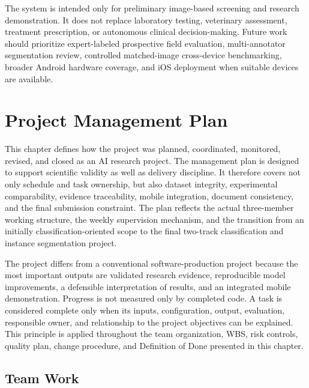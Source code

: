 \documentclass[12pt,a4paper]{report}
\newenvironment{revisionblock}{\begin{snugshade}\noindent}{\end{snugshade}}
\begin{document}
\begin{revisionblock}
The system is intended only for preliminary image-based screening and research demonstration. It does not replace laboratory testing, veterinary assessment, treatment prescription, or autonomous clinical decision-making. Future work should prioritize expert-labeled prospective field evaluation, multi-annotator segmentation review, controlled matched-image cross-device benchmarking, broader Android hardware coverage, and iOS deployment when suitable devices are available.
\end{revisionblock}
\chapter{Project Management Plan}
This chapter defines how the project was planned, coordinated, monitored, revised, and closed as an AI research project. The management plan is designed to support scientific validity as well as delivery discipline. It therefore covers not only schedule and task ownership, but also dataset integrity, experimental comparability, evidence traceability, mobile integration, document consistency, and the final submission constraint. The plan reflects the actual three-member working structure, the weekly supervision mechanism, and the transition from an initially classification-oriented scope to the final two-track classification and instance segmentation project.\par
The project differs from a conventional software-production project because the most important outputs are validated research evidence, reproducible model improvements, a defensible interpretation of results, and an integrated mobile demonstration. Progress is not measured only by completed code. A task is considered complete only when its inputs, configuration, output, evaluation, responsible owner, and relationship to the project objectives can be explained. This principle is applied throughout the team organization, WBS, risk controls, quality plan, change procedure, and Definition of Done presented in this chapter.\par
\section{Team Work}
\end{document}
